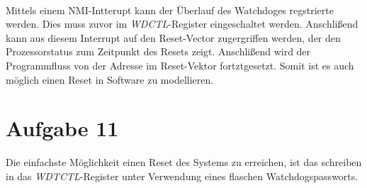 \paragraph*{}
Mittels einem NMI-Intterupt kann der Überlauf des Watchdoges regstrierte werden. Dies muss zuvor im {\em WDCTL}-Register eingeschaltet werden. Anschlißend kann aus diesem Interrupt auf den Reset-Vector zugergriffen werden, der den Prozessorstatus zum Zeitpunkt des Resets zeigt. Anschlißend wird der Programmfluss von der Adresse im Reset-Vektor fortztgesetzt. Somit ist es auch möglich einen Reset in Software zu modellieren.

\section{Aufgabe 11}

Die einfachste Möglichkeit einen Reset des Systems zu erreichen, ist das schreiben in das {\em WDTCTL}-Register unter Verwendung eines flaschen Watchdogspassworts.\\



